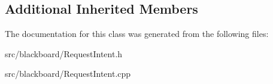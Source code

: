\subsection*{Additional Inherited Members}


The documentation for this class was generated from the following files\+:\begin{DoxyCompactItemize}
\item 
src/blackboard/Request\+Intent.\+h\item 
src/blackboard/Request\+Intent.\+cpp\end{DoxyCompactItemize}
